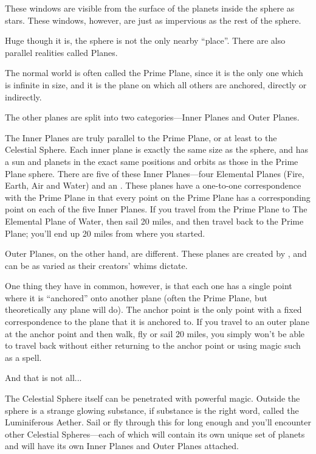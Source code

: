 \begin{multicols*}{2}
These windows are visible from the surface of the planets inside the sphere as stars. These windows, however, are just as impervious as the rest of the sphere.

Huge though it is, the sphere is not the only nearby “place”. There are also parallel realities called Planes.

The normal world is often called the \hypertarget{sec:Prime Plane}{Prime Plane}, since it is the only one which is infinite in size, and it is the plane on which all others are anchored, directly or indirectly.

The other planes are split into two categories—Inner Planes and Outer Planes.

The Inner Planes are truly parallel to the Prime Plane, or at least to the Celestial Sphere. Each inner plane is exactly the same size as the sphere, and has a sun and planets in the exact same positions and orbits as those in the Prime Plane sphere. There are five of these Inner Planes—four Elemental Planes (Fire, Earth, Air and Water) and an . These planes have a one-to-one correspondence with the Prime Plane in that every point on the Prime Plane has a corresponding point on each of the five Inner Planes. If you travel from the Prime Plane to The Elemental Plane of Water, then sail 20 miles, and then travel back to the Prime Plane; you’ll end up 20 miles from where you started.

Outer Planes, on the other hand, are different. These planes are created by , and can be as varied as their creators’ whims dictate.

One thing they have in common, however, is that each one has a single point where it is “anchored” onto another plane (often the Prime Plane, but theoretically any plane will do). The anchor point is the only point with a fixed correspondence to the plane that it is anchored to. If you travel to an outer plane at the anchor point and then walk, fly or sail 20 miles, you simply won’t be able to travel back without either returning to the anchor point or using magic such as a  spell.

And that is not all...

The Celestial Sphere itself can be penetrated with powerful magic. Outside the sphere is a strange glowing substance, if substance is the right word, called the Luminiferous Aether. Sail or fly through this for long enough and you’ll encounter other Celestial Spheres—each of which will contain its own unique set of planets and will have its own Inner Planes and Outer Planes attached.


\end{multicols*}
